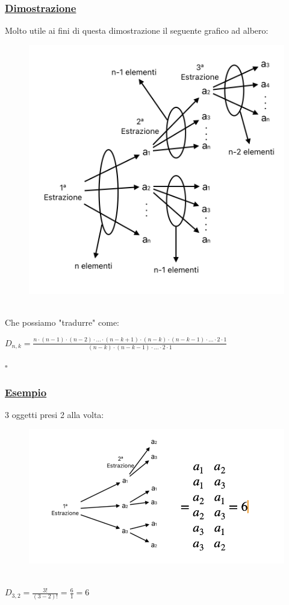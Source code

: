 \documentclass{article}
\begin{document}
\subsubsection{\underline{Dimostrazione}}
Molto utile ai fini di questa dimostrazione il seguente grafico ad albero: 
\begin{figure}[h]
\centering
\includegraphics[scale=0.45]{3.Dispo1.png}
\end{figure} \\
Che possiamo "tradurre" come:
\begin{center}
    $D_{n,k} = \frac{n \cdot (n-1) \cdot (n-2) \cdot \dots \cdot(n-k+1) \cdot (n-k) \cdot (n-k-1) \cdot \dots \cdot 2 \cdot 1}{(n-k) \cdot (n-k-1) \cdot \dots \cdot 2 \cdot 1}$
\end{center}
\hspace*{0pt}\hfill $\square$ \\
\subsubsection{\underline{Esempio}}
3 oggetti presi 2 alla volta:
\begin{figure}[h]
\centering
\includegraphics[scale=0.5]{4.Dispo2.png}
\end{figure} \\
$D_{3,2} = \frac{3!}{(3-2)!} = \frac{6}{1} = 6$
\end{document}
